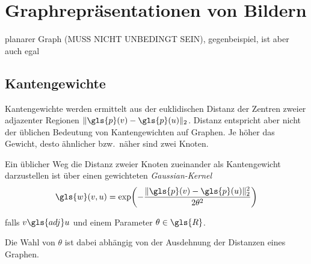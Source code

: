 \chapter{Graphrepräsentationen von Bildern}

planarer Graph (MUSS NICHT UNBEDINGT SEIN), gegenbeispiel, ist aber auch egal

\section{Kantengewichte}

Kantengewichte werden ermittelt aus der euklidischen Distanz der Zentren zweier adjazenter Regionen $\left\|\gls{p}\left(v\right) - \gls{p}\left(u\right)\right\|_2$.
Distanz entspricht aber nicht der üblichen Bedeutung von Kantengewichten auf Graphen.
Je höher das Gewicht, desto ähnlicher bzw.\ näher sind zwei Knoten.

Ein üblicher Weg die Distanz zweier Knoten zueinander als Kantengewicht darzustellen ist über einen gewichteten \emph{Gaussian-Kernel}~\cite{Shuman}
\begin{equation}
  \gls{w}\left(v, u\right) = \exp\left(-\frac{\left\|\gls{p}\left(v\right) - \gls{p}\left(u\right)\right\|_2^2}{2\theta^2}\right)
\end{equation}

falls $v \gls{adj} u$ und einem Parameter $\theta \in \gls{R}$.

Die Wahl von $\theta$ ist dabei abhängig von der Ausdehnung der Distanzen eines Graphen.

\begin{center}
\end{center}
